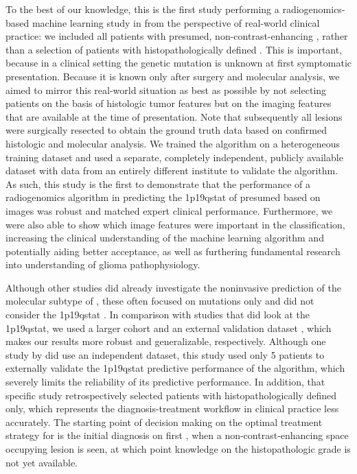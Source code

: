 To the best of our knowledge, this is the first study performing a radiogenomics-based machine learning study in  from the perspective of real-world clinical practice: we included all patients with presumed, non-contrast-enhancing , rather than a selection of patients with histopathologically defined .
This is important, because in a clinical setting the genetic mutation is unknown at first symptomatic presentation.
Because it is known only after surgery and molecular analysis, we aimed to mirror this real-world situation as best as possible by not selecting patients on the basis of histologic \gls{tumor} features but on the imaging features that are available at the time of presentation.
Note that subsequently all lesions were surgically resected to obtain the ground truth data based on confirmed histologic and molecular analysis.
We trained the algorithm on a heterogeneous training dataset and used a separate, completely independent, publicly available dataset with data from an entirely different institute to validate the algorithm.
As such, this study is the first to demonstrate that the performance of a radiogenomics algorithm in predicting the \acl{1p19qstat} of presumed  based on  images was robust and matched expert clinical performance.
Furthermore, we were also able to show which image features were important in the classification, increasing the clinical understanding of the machine learning algorithm and potentially aiding better acceptance, as well as furthering fundamental research into understanding of glioma pathophysiology.

Although other studies did already investigate the noninvasive prediction of the molecular subtype of , these often focused on  mutations only and did not consider the \acl{1p19qstat} \autocite{li2017deep, ren2019noninvasive, yu2017noninvasive}.
In comparison with studies that did look at the \acl{1p19qstat}, we used a larger cohort and an external validation dataset \autocite{akkus2017predicting, chang2018deep, han2018non, park2018prediction, shofty2018mri}, which makes our results more robust and generalizable, respectively.
Although one study by  did use an independent dataset, this study used only 5 patients to externally validate the \acl{1p19qstat} predictive performance of the algorithm, which severely limits the reliability of its predictive performance.
In addition, that specific study retrospectively selected patients with histopathologically defined  only, which represents the diagnosis-treatment workflow in clinical practice less accurately.
The starting point of decision making on the optimal treatment strategy for  is the initial diagnosis on first , when a non-contrast-enhancing space occupying lesion is seen, at which point knowledge on the histopathologic grade is not yet available.


